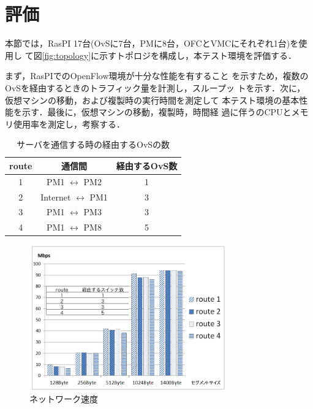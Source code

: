 \documentclass[submit,techrep]{ipsj}
\begin{document}
\section{評価}
本節では，RasPI 17台(OvSに7台，PMに8台，OFCとVMCにそれぞれ1台)を使用し
て図\ref{fig:topology}に示すトポロジを構成し，本テスト環境を評価する．

まず，RasPIでのOpenFlow環境が十分な性能を有すること
を示すため，複数のOvSを経由するときのトラフィック量を計測し，スループッ
トを示す．次に，仮想マシンの移動，および複製時の実行時間を測定して
本テスト環境の基本性能を示す．最後に，仮想マシンの移動，複製時，時間経
過に伴うのCPUとメモリ使用率を測定し，考察する．


\begin{table}[tb]
	\centering
	\caption{サーバを通信する時の経由するOvSの数}
	\label{tab:route}
	\vspace{4mm}
	{
		\begin{tabular}{ c c c } \hline
      route & 通信間 & 経由するOvS数 \\ \hline \hline
      1 & PM1 $\longleftrightarrow$	PM2 & 1 \\ \hline
      2 & Internet $\longleftrightarrow$ PM1 & 3 \\ \hline
      3 & PM1 $\longleftrightarrow$	PM3 & 3 \\ \hline
      4 & PM1 $\longleftrightarrow$	PM8 & 5 \\ \hline
		\end{tabular}
	}
\end{table}

\begin{figure}[tb]
	\includegraphics[width=8.5cm,bb=0 0 755 558]{fig/graph.png}
	\caption{ネットワーク速度}
	\label{fig:graph}
\end{figure}
\end{document}
